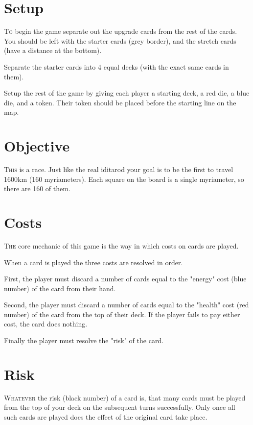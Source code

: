\documentclass{article}
\begin{document}
\begin{multicols}{3}

\section{Setup}

    \textsc{To} begin the game separate out the upgrade cards from the rest of the cards.
    You should be left with the starter cards (grey border), and the stretch
    cards (have a distance at the bottom).

    Separate the starter cards into 4 equal decks (with the exact same cards in
    them).

    Setup the rest of the game by giving each player a starting deck, a red die,
    a blue die, and a token. Their token should be placed before the starting
    line on the map.

\section{Objective}

    \textsc{This} is a race. Just like the real iditarod your goal is to be the first to
    travel 1600km (160 myriameters). Each square on the board is a single
    myriameter, so there are 160 of them.

\section{Costs}

    \textsc{The} core mechanic of this game is the way in which costs on cards are
    played.

    When a card is played the three costs are resolved in order.

    First, the player must discard a number of cards equal to the "energy" cost
    (blue number) of the card from their hand.

    Second, the player must discard a number of cards equal to the "health" cost
    (red number) of the card from the top of their deck. If the player fails to
    pay either cost, the card does nothing.

    Finally the player must resolve the "risk" of the card.

\section{Risk}

    \textsc{Whatever} the risk (black number) of a card is, that many cards must be
    played from the top of your deck on the subsequent turns successfully. Only
    once all such cards are played does the effect of the original card take
    place.


\end{multicols}
\end{document}
